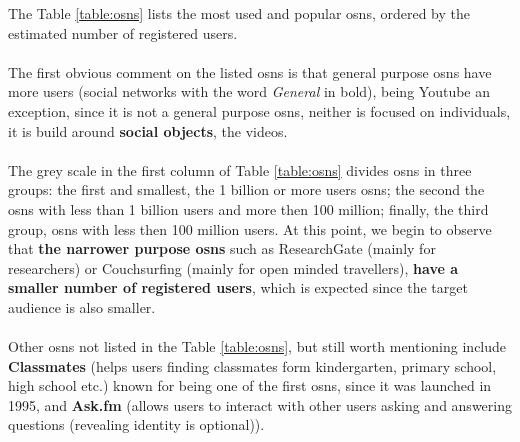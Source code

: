 \indent The Table \ref{table:osns} lists the most used and popular \glspl{osn}, ordered by the estimated number of registered users.
\\\\
\indent The first obvious comment on the listed \glspl{osn} is that general purpose \glspl{osn} have more users (social
networks with the word \textit{General} in bold), being Youtube an exception, since it is not a general purpose \glspl{osn}, neither
is focused on individuals, it is build around \textbf{social objects}, the videos.
\\\\
\indent The grey scale in the first column of Table \ref{table:osns} divides \glspl{osn} in three groups: the first and smallest, the 1 billion
or more users \glspl{osn}; the second the \glspl{osn} with less than 1 billion users and more then 100 million; finally, the third group, \glspl{osn} with
less then 100 million users. At this point, we begin to observe that \textbf{the narrower purpose \glspl{osn}} such as ResearchGate (mainly for researchers) or
Couchsurfing (mainly for open minded travellers), \textbf{have a smaller number of registered users}, which is expected since the target audience is also smaller.
\\\\
\indent Other \glspl{osn} not listed in the Table \ref{table:osns}, but still worth mentioning include \textbf{Classmates} (helps users finding
classmates form kindergarten, primary school, high school etc.) known for being one of the first \glspl{osn}, since it was
launched in 1995, and \textbf{Ask.fm} (allows users to interact with other users asking and answering questions (revealing identity is optional)).



